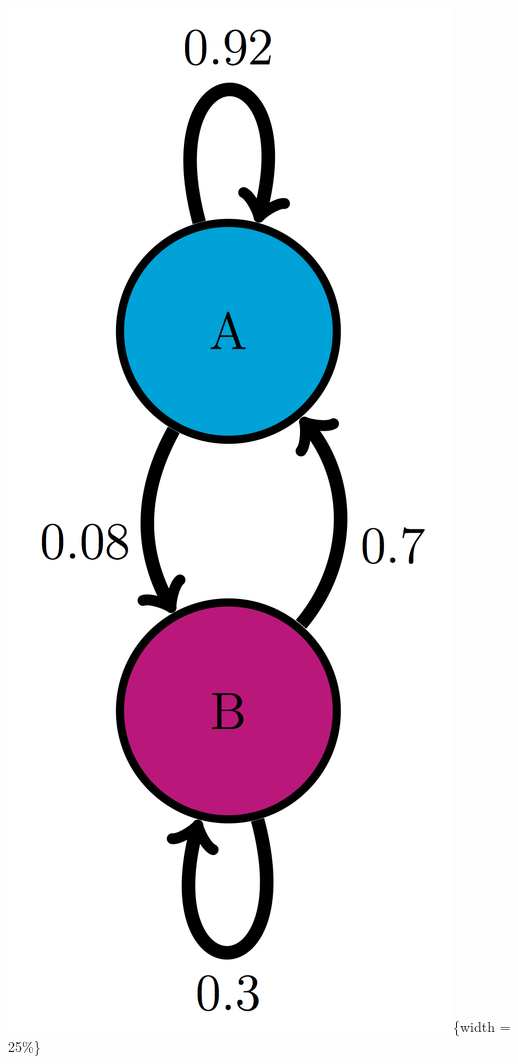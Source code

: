 \documentclass[
  letterpaper,
  DIV=11,
  numbers=noendperiod]{scrreprt}
\begin{document}
\includegraphics{./ch10/AB_trans_diag.png}\{width = 25\%\}
\end{document}

